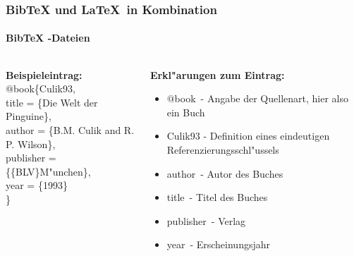 
\begin{frame}
\frametitle{BibTeX und \LaTeX ~in Kombination}
\framesubtitle{BibTeX -Dateien}
\begin{columns}
\begin{column}{0.52\textwidth}
\textbf{Beispieleintrag:}\\[1em]

\color{nounibaredI}$@$book\color{black}\{Culik93,\\
\color{nounibaredI}title\color{black} = \{Die Welt der Pinguine\},\\
\color{nounibaredI}author\color{black} = \{B.M. Culik and R. P. Wilson\},\\
\color{nounibaredI}publisher\color{black} = \{\{BLV\}M"unchen\},\\
\color{nounibaredI}year\color{black} = \{1993\}\\
\}
\end{column}
\begin{column}{0.55\textwidth}
\textbf{Erkl"arungen zum Eintrag:}
\begin{itemize}
\item \color{nounibaredI}$@$book\color{black}~- Angabe der Quellenart, hier also ein Buch
\item Culik93 - Definition eines eindeutigen Referenzierungsschl"ussels
\item \color{nounibaredI}author\color{black}~- Autor des Buches
\item \color{nounibaredI}title\color{black}~- Titel des Buches
\item \color{nounibaredI}publisher\color{black}~- Verlag
\item \color{nounibaredI}year\color{black}~- Erscheinungsjahr
\end{itemize}
\end{column}
\end{columns}

\end{frame}


